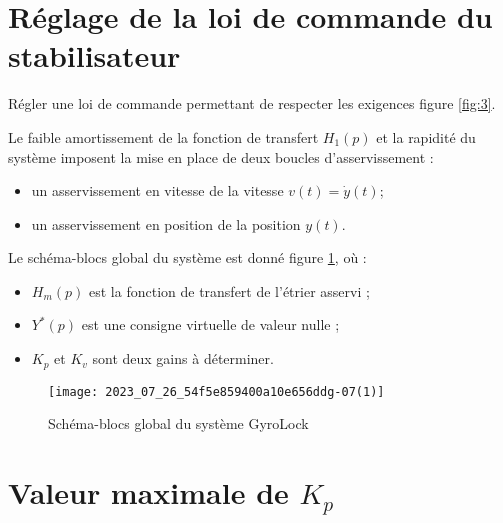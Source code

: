 
\section{Réglage de la loi de commande du stabilisateur}
\begin{obj}
Régler une loi de commande permettant de respecter les exigences figure \ref{fig:3}.
\end{obj}

Le faible amortissement de la fonction de transfert $H_{1}(p)$ et la rapidité du système imposent la mise en place de deux boucles d'asservissement :
\begin{itemize}
 \item  un asservissement en vitesse de la vitesse $v(t)=\dot{y}(t)$;
  \item un asservissement en position de la position $y(t)$.
\end{itemize}

Le schéma-blocs global du système est donné figure \ref{fig:11}, où :

\begin{itemize}
  \item $H_{m}(p)$ est la fonction de transfert de l'étrier asservi ;

  \item $Y^{*}(p)$ est une consigne virtuelle de valeur nulle ;

  \item $K_{p}$ et $K_{v}$ sont deux gains à déterminer.

\end{itemize}


\begin{figure}[!h]
\centering
\texttt{[image: 2023\_07\_26\_54f5e859400a10e656ddg-07(1)]}
\caption{\label{fig:11}Schéma-blocs global du système GyroLock}
\end{figure}

\section{\label{sec:III.A} Valeur maximale de $K_{p}$}



